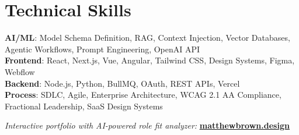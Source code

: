 \documentclass[letterpaper,11pt]{article}
\begin{document}
\section{Technical Skills}
 \begin{itemize}[leftmargin=0.15in, label={}]
    \small{\item{
     \textbf{AI/ML}{: Model Schema Definition, RAG, Context Injection, Vector Databases, Agentic Workflows, Prompt Engineering, OpenAI API} \\
     \textbf{Frontend}{: React, Next.js, Vue, Angular, Tailwind CSS, Design Systems, Figma, Webflow} \\
     \textbf{Backend}{: Node.js, Python, BullMQ, OAuth, REST APIs, Vercel} \\
     \textbf{Process}{: SDLC, Agile, Enterprise Architecture, WCAG 2.1 AA Compliance, Fractional Leadership, SaaS Design Systems}
    }}
 \end{itemize}
 \vspace{-16pt}

\begin{center}
    \vspace{12pt}
    \small \textit{Interactive portfolio with AI-powered role fit analyzer:} \textbf{\href{https://matthewbrown.design}{\underline{matthewbrown.design}}}
\end{center}
\end{document}
